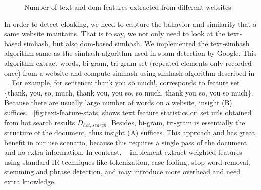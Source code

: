 \begin{figure}[t]
  \centering
\caption{Number of text and dom features extracted from different websites}
\end{figure}

In order to detect cloaking, we need to capture the bahavior and similarity that
a same website maintains. That is to say, we not only need to look at the text-based simhash,
but also dom-based simhash. We implemented the text-simhash algorithm 
same as the simhash algorithm used in spam detection by Google.
This algorithm extract words, bi-gram, tri-gram set
(repeated elements only recorded once) from a website and compute simhash using
simhash algorithm described in ~\cite{charikar2002similarity}. For example, for
sentence: thank you so much!, corresponds to feature set \{thank, you, so, much,
thank you, you so, so much, thank you so, you so much\}.
Because there are usually large number of words on a website, insight (B)
suffices. ~\autoref{fig:text-feature-stats} shows text feature statistics on %
set urls obtained from hot search results $D_{hot, search}$. Besides, bi-gram, tri-gram is essentially the structure of the document,
thus insight (A) suffices.
This approach
and has great benefit in our use scenario, because this requires a single pass
of the document and no extra information. In contrast,
~\cite{manku2007detecting} implement extract weighted features using standard IR
techniques like tokenization, case folding, stop-word removal, stemming and
phrase detection, and may introduce more overhead and need extra knowledge.



